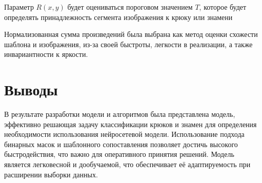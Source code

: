 Параметр \( R(x, y) \) будет оцениваться пороговом значением \( T \), которое будет определять принадлежность сегмента
изображения к крюку или знамени

Нормализованная сумма произведений была выбрана как метод оценки схожести шаблона и изображения, из-за своей быстроты, легкости в реализации, а также
инвариантности к яркости\cite{MGonsales}.

\section{Выводы}

В результате разработки модели и алгоритмов была представлена модель, эффективно решающая задачу классификации 
крюков и знамен для определения необходимости использования нейросетевой модели. Использование подхода 
бинарных масок и шаблонного сопоставления позволяет достичь высокого быстродействия, что важно для 
оперативного принятия решений. Модель является легковесной и дообучаемой, что обеспечивает 
её адаптируемость при расширении выборки данных.


